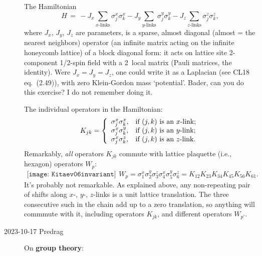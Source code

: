 \begin{description}
The Hamiltonian
\begin{equation} \label{Kitaev06:Hamiltonian}
H\,=\,
-J_{x} \sum_{\text{$x$-links}} \sigma_{j}^{x}\sigma_{k}^{x}
-J_{y} \sum_{\text{$y$-links}} \sigma_{j}^{y}\sigma_{k}^{y}
-J_{z} \sum_{\text{$z$-links}} \sigma_{j}^{z}\sigma_{k}^{z},
\end{equation}
where $J_{x}$, $J_{y}$, $J_{z}$ are parameters, is a sparse,
almost diagonal (almost = the nearest neighbors) operator (an infinite
matrix acting on the infinite honeycomb lattice) of a block diagonal
form: it acts on lattice site 2-component 1/2-spin field with a 2\dmn\
local matrix (Pauli matrices, the identity). Were $J_{x}=J_{y}=J_{z}$,
one could write it as a Laplacian (see
{CL18 eq.~(2.49)}), with zero Klein-Gordon mass `potential'.
Bader, can you do this exercise? I do not remember doing it.

The individual operators in the Hamiltonian:
\begin{equation} \label{terms}
K_{jk}= \left\{
\begin{array}{l@{\quad}l}
\sigma_{j}^{x}\sigma_{k}^{x}, & \text{if $(j,k)$ is an $x$-link;} \\
\sigma_{j}^{x}\sigma_{k}^{y}, & \text{if $(j,k)$ is an $y$-link;} \\
\sigma_{j}^{x}\sigma_{k}^{z}, & \text{if $(j,k)$ is an $z$-link.}
\end{array}
\right.
\end{equation}
Remarkably, \emph{all} operators $K_{jk}$
commute with lattice plaquette (i.e., hexagon) operators
$W_{p}$:
\begin{equation} \label{Kitaev06:invariant}
\begin{array}{c} \texttt{[image: Kitaev06invariant]} \end{array} %
W_{p}=\sigma_{1}^{x}\sigma_{2}^{y}\sigma_{3}^{z}
\sigma_{4}^{x}\sigma_{5}^{y}\sigma_{6}^{z}
=K_{12}K_{23}K_{34}K_{45}K_{56}K_{61}.
\end{equation}
It's probably not remarkable. As explained above, any non-repeating pair
of shifts along $x$-, $y$-, $z$-links is a unit lattice translation. The
three consecutive such in the chain \refeq{Kitaev06:invariant} add up to
a zero translation, so anything will commmute with it, including
operators $K_{jk}$, and different operators $W_{p'}$.

\item[2023-10-17 Predrag] On \textbf{group theory}:


\end{description}

